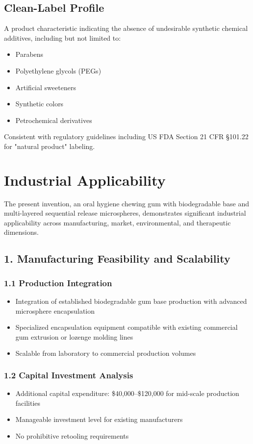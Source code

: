 \documentclass[12pt]{article}
\begin{document}
\subsection*{Clean-Label Profile}
A product characteristic indicating the absence of undesirable synthetic chemical additives, including but not limited to:
\begin{itemize}
    \item Parabens
    \item Polyethylene glycols (PEGs)
    \item Artificial sweeteners
    \item Synthetic colors
    \item Petrochemical derivatives
\end{itemize}
Consistent with regulatory guidelines including US FDA Section 21 CFR §101.22 for "natural product" labeling.


\section*{Industrial Applicability}

The present invention, an oral hygiene chewing gum with biodegradable base and multi-layered sequential release microspheres, demonstrates significant industrial applicability across manufacturing, market, environmental, and therapeutic dimensions.

\subsection*{1. Manufacturing Feasibility and Scalability}

\subsubsection*{1.1 Production Integration}
\begin{itemize}
    \item Integration of established biodegradable gum base production with advanced microsphere encapsulation
    \item Specialized encapsulation equipment compatible with existing commercial gum extrusion or lozenge molding lines
    \item Scalable from laboratory to commercial production volumes
\end{itemize}

\subsubsection*{1.2 Capital Investment Analysis}
\begin{itemize}
    \item Additional capital expenditure: \$40,000--\$120,000 for mid-scale production facilities
    \item Manageable investment level for existing manufacturers
    \item No prohibitive retooling requirements
\end{itemize}
\end{document}
